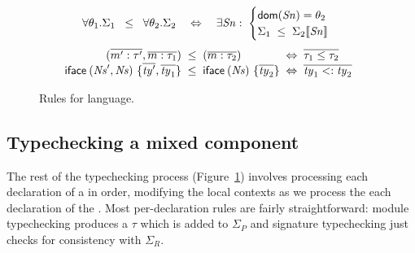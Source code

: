\begin{figure}[t]


\[
  \forall\theta_1.\Sigma_1 \;\;\le\;\; \forall\theta_2.\Sigma_2
  \quad\Leftrightarrow\quad
  \exists \mathit{Sn} :\;
    \begin{cases}
      \mathsf{dom}(\mathit{Sn}) = \theta_2 \\
      \Sigma_1 \;\le\; \Sigma_2\llbracket\mathit{Sn}\rrbracket
    \end{cases}
\]
\[
\begin{array}{@{}r@{\;\;}c@{\;\;}l@{\;\;}c@{\;\;}l}
  (\overline{m':\tau'},\overline{m:\tau_1})
    &\le&
    (\overline{m:\tau_2})
      &\Leftrightarrow&
      \overline{\tau_1 \le \tau_2}
  \\
  \UobjTau{\UNs',\UNs}{\overline{\Uty'},\overline{\Uty_1}}
    &\le&
    \UobjTau{\UNs}{\overline{\Uty_2}}
      &\Leftrightarrow&
      \overline{\Uty_1 <: \Uty_2}
\end{array}
\]

\caption{Rules for \unit{} language.}
\label{fig:unit-ty-rules}
\end{figure}

\subsection{Typechecking a mixed component}

The rest of the typechecking process (Figure~\ref{fig:unit-ty-rules})
involves processing each declaration of a \unit{} in order, modifying
the local contexts as we process the each declaration of the \unit{}.
Most per-declaration rules are fairly straightforward: module
typechecking produces a $\tau$ which is added to $\Sigma_P$ and signature
typechecking just checks for consistency with $\Sigma_R$.

